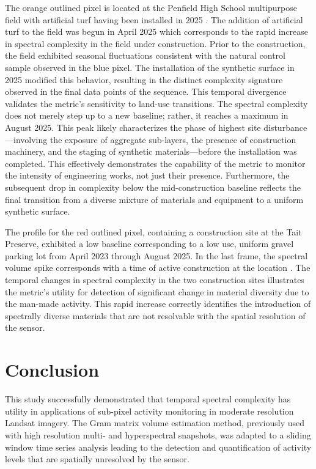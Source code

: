 \documentclass[conference,a4paper]{IEEEtran}
\begin{document}
The orange outlined pixel is located at the Penfield High School multipurpose field with artificial turf having been installed in 2025 \cite{noauthor_penfield_2025, district_penfield_nodate}. The addition of artificial turf to the field was begun in April 2025 which corresponds to the rapid increase in spectral complexity in the field under construction. Prior to the construction, the field exhibited seasonal fluctuations consistent with the natural control sample observed in the blue pixel. The installation of the synthetic surface in 2025 modified this behavior, resulting in the distinct complexity signature observed in the final data points of the sequence. 
This temporal divergence validates the metric's sensitivity to land-use transitions. The spectral complexity does not merely step up to a new baseline; rather, it reaches a maximum in August 2025. This peak likely characterizes the phase of highest site disturbance—involving the exposure of aggregate sub-layers, the presence of construction machinery, and the staging of synthetic materials—before the installation was completed. This effectively demonstrates the capability of the metric to monitor the intensity of engineering works, not just their presence. Furthermore, the subsequent drop in complexity below the mid-construction baseline reflects the final transition from a diverse mixture of materials and equipment to a uniform synthetic surface. %

The profile for the red outlined pixel, containing a construction site at the Tait Preserve, exhibited a low baseline corresponding to a low use, uniform gravel parking lot from April 2023 through August 2025. In the last frame, the spectral volume spike corresponds with a time of active construction at the location \cite{Tait_Field_Station_2025}. The temporal changes in spectral complexity in the two construction sites illustrates the metric's utility for detection of significant change in material diversity due to the man-made activity. This rapid increase correctly identifies the introduction of spectrally diverse materials that are not resolvable with the spatial resolution of the sensor. 

\section{Conclusion}
This study successfully demonstrated that temporal spectral complexity has utility in applications of sub-pixel activity monitoring in moderate resolution Landsat imagery. The Gram matrix volume estimation method, previously used with high resolution multi- and hyperspectral snapshots, was adapted to a sliding window time series analysis leading to the detection and quantification of activity levels that are spatially unresolved by the sensor. 
\end{document}

